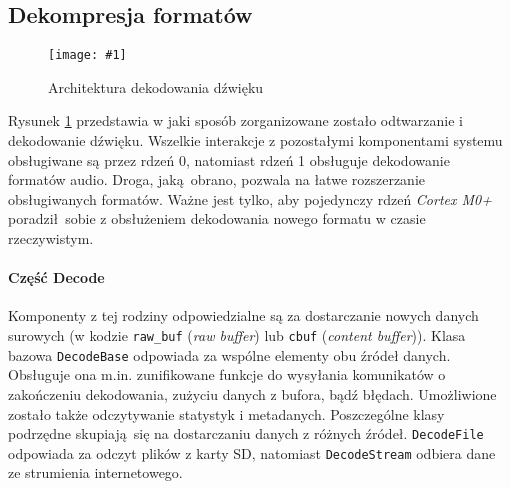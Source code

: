 \documentclass[12pt]{report}
\newcommand{\imgint}[4]{
	\begin{figure}[{#4}]
		\centering
		\texttt{[image: \#1]}
		\caption{#2}
		\label{#1}
	\end{figure}
}
\newcommand{\imgh}[3]{\imgint{#1}{#2}{#3}{H}}
\begin{document}
		\subsection{Dekompresja formatów}
			\label{sec:decode}
%			
%			
		
			\imgh{3/PicoRadio-sound-decoding}{Architektura dekodowania dźwięku}{0.95}
			
			Rysunek \ref{3/PicoRadio-sound-decoding} przedstawia w jaki sposób zorganizowane zostało odtwarzanie i dekodowanie dźwięku. Wszelkie interakcje z pozostałymi komponentami systemu obsługiwane są przez rdzeń 0, natomiast rdzeń 1 obsługuje dekodowanie formatów audio. Droga, jaką obrano, pozwala na łatwe rozszerzanie obsługiwanych formatów. Ważne jest tylko, aby pojedynczy rdzeń \textit{Cortex M0+} poradził sobie z obsłużeniem dekodowania nowego formatu w czasie rzeczywistym.
			
		
			\paragraph{Część Decode}
				Komponenty z tej rodziny odpowiedzialne są za dostarczanie nowych danych surowych (w kodzie \lstinline|raw_buf| (\textit{raw buffer}) lub \lstinline|cbuf| (\textit{content buffer})). Klasa bazowa \lstinline|DecodeBase| odpowiada za wspólne elementy obu źródeł danych. Obsługuje ona m.in. zunifikowane funkcje do wysyłania komunikatów o zakończeniu dekodowania, zużyciu danych z bufora, bądź błędach. Umożliwione zostało także odczytywanie statystyk i metadanych. Poszczególne klasy podrzędne skupiają się na dostarczaniu danych z różnych źródeł. \lstinline|DecodeFile| odpowiada za odczyt plików z karty SD, natomiast \lstinline|DecodeStream| odbiera dane ze strumienia internetowego.
			
\end{document}
